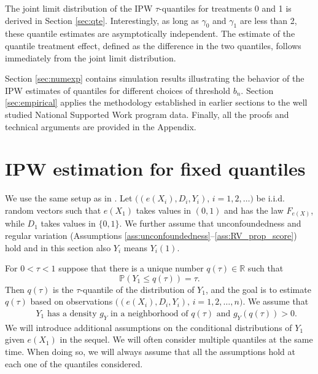 \documentclass[12pt]{amsart}
\newcommand{\bbr}{\mathbb{R}}
\newcommand{\LFe}{F_{e(X)}}
\newcommand{\1}{\mathbbm{1}}
\newcommand{\0}{\mathbf{0}}
\theoremstyle{plain}
\theoremstyle{definition}
\newcommand{\bbP}{\mathbb{P}}
\begin{document}
The joint limit distribution of the IPW $\tau$-quantiles for treatments 0 and 1 is derived in Section \ref{sec:qte}.  Interestingly, as long as $\gamma_0$ and $\gamma_1$ are less than 2, these quantile estimates are asymptotically independent.  The estimate of the quantile treatment effect, defined as the difference in the two quantiles, follows immediately from the joint limit distribution.

  Section \ref{sec:numexp} contains simulation results illustrating  the behavior of the IPW estimates of quantiles for different choices of threshold $b_n$.  Section \ref{sec:empirical} applies the methodology established in earlier sections to the well studied National Supported Work program data.  Finally, all the proofs and technical arguments are provided in the Appendix.  









\section{IPW estimation for fixed quantiles} \label{sec:IPW-quantile}

We use the same setup as in  \cite{ma:wang2020}. Let $\bigl( (e(X_i),
D_i, Y_i), \, i=1,2,\ldots\bigr)$ be i.i.d. random vectors such that
$e(X_1)$ takes values in $(0,1)$ and has the law $\LFe$, while $D_1$ takes
values in $\{0,1\}$. We further assume that unconfoundedness and regular variation (Assumptions \ref{ass:unconfoundedness}--\ref{ass:RV_prop_score}) hold and in this section also $Y_i$ means  $Y_i(1)$. 

For $0<\tau<1$ suppose that there is a unique number $q(\tau)\in\bbr$
such that
%
\begin{equation} \label{e:quant.def}
    \bbP(Y_1\leq q(\tau))=\tau.
\end{equation}
%
Then $q(\tau)$ is the $\tau$-quantile of the distribution of $Y_1$,
and the goal is to estimate $q(\tau)$  based on observations $\bigl( (e(X_i),
D_i, Y_i), \, i=1,2,\ldots, n\bigr)$. We assume that
%
\begin{eqnarray} \label{e:dens,tau}
& &\text{$Y_1$ has a density  $g_{Y}$ in a neighborhood of $q(\tau)$ and  $g_Y(q(\tau))>0$.} 
\end{eqnarray}
%
We will introduce additional assumptions on the conditional distributions of $Y_1$ given $e(X_1)$ in the sequel. We will often consider multiple quantiles at the same
time. When doing so, we will always assume that all the  assumptions
hold at each one of the quantiles considered.
\end{document}
